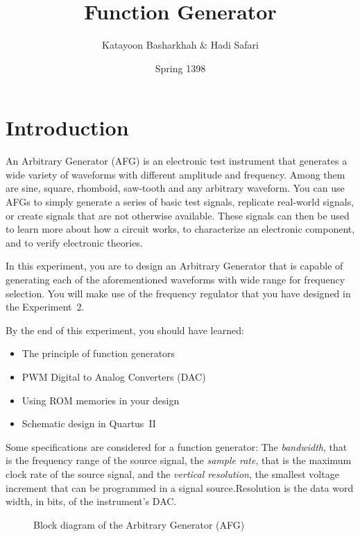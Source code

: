 \documentclass[12pt, logo=tehranDLDL/ut]{tehranDLDL}
\title{Function Generator}
\author{Katayoon Basharkhah \& Hadi Safari}
\date{Spring 1398}
\begin{document}
\maketitle

\tableofcontents
\newpage

\section*{Introduction}

An Arbitrary Generator (AFG) is an electronic test instrument that generates a wide variety of waveforms with different amplitude and frequency. Among them are sine, square, rhomboid, saw-tooth and any arbitrary waveform. You can use AFGs to simply generate a series of basic test signals, replicate real-world signals, or create signals that are not otherwise available. These signals can then be used to learn more about how a circuit works, to characterize an electronic component, and to verify electronic theories.

In this experiment, you are to design an Arbitrary Generator that is capable of generating each of the aforementioned waveforms with wide range for frequency selection. You will make use of the frequency regulator that you have designed in the Experiment~2.

By the end of this experiment, you should have learned:

\begin{itemize}
    \item The principle of function generators
    \item PWM Digital to Analog Converters (DAC)
    \item Using ROM memories in your design
    \item Schematic design in Quartus~II
\end{itemize}

Some specifications are considered for a function generator:
The \textit{bandwidth}, that is the frequency range of the source signal,
the \textit{sample rate}, that is the maximum clock rate of the source signal,
and the \textit{vertical resolution}, the smallest voltage increment that can be programmed in a signal source.Resolution is the data word width, in bits, of the instrument’s DAC.

\begin{figure}[b]
    \centering
    \caption{Block diagram of the Arbitrary Generator (AFG)\label{fig:AFGblockdia}}
    \resizebox{0.9\textwidth}{!}{}
\end{figure}
\end{document}
